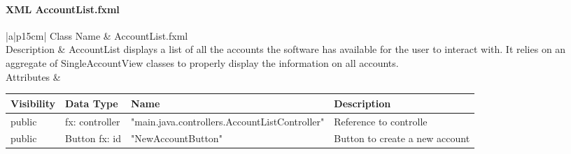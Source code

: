 \documentclass[12pt]{article}
\begin{document}
\paragraph{XML AccountList.fxml}
\begin{table}[H]
	\begin{tabular}{|a|p{15cm}|}
		\hline
		{Class Name} & {AccountList.fxml} \\
		\hline
		Description & AccountList displays a list of all the accounts the software has available for the user to interact with. It relies on an aggregate of SingleAccountView classes to properly display the information on all accounts.\\
		\hline
		Attributes & 
		\begin{tabular}{| p{2cm} | p{3.5cm} | p{1.5cm} | p{6.45cm} |}
			\hline
			\rowcolor{lightgray}
			Visibility & Data Type & Name & Description \\
			\hline
			\rowcolor{white}
			public & fx: controller& "main.java.controllers.AccountListController"  & Reference to controlle\\
			\hline
			public & Button fx: id & "NewAccountButton" & Button to create a new account\\
			\hline
		\end{tabular} \\
		\hline							 
	\end{tabular}
\end{table}
\end{document}
